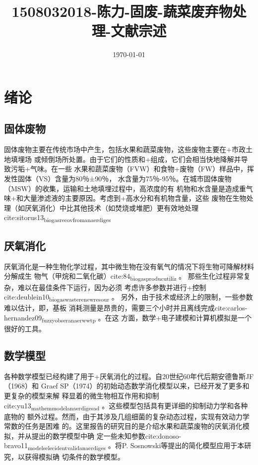 \documentclass[11pt]{article}
\date{\today}
\title{1508032018-陈力-固废-蔬菜废弃物处理-文献宗述}
\begin{document}
\maketitle
\tableofcontents



\section{绪论}
\label{sec:org1f9e960}
\subsection{固体废物}
\label{sec:org491d7c1}
固体废物主要在传统市场中产生，包括水果和蔬菜废物，这些废物主要在+市政土地填埋场
或倾倒场所处置。由于它们的性质和+组成，它们会相当快地降解并导致污垢+气味。在一些
水果和蔬菜废物（FVW）和食物+废物（FW）样品中，挥发性固体（VS）含量为80％±90％，
水含量为75％-95％。在城市固体废物（MSW）的收集，运输和土地填埋过程中，高浓度的有
机物和水含量是造成重气味+和大量渗滤液的主要原因。考虑到+高水分和有机物含量，这些
废物在生物处理（如厌氧消化）中比其他技术（如焚烧或堆肥）更有效地处理cite:sitorus13\textsubscript{biogas}\textsubscript{recov}\textsubscript{from}\textsubscript{anaer}\textsubscript{diges}

\subsection{厌氧消化}
\label{sec:org573a621}
厌氧消化是一种生物化学过程，其中微生物在没有氧气的情况下将生物可降解材料分解成生
物气（甲烷和二氧化碳）cite:84\textsubscript{biogas}\textsubscript{produc}\textsubscript{utiliz} 。 那些生化过程非常复杂，难以在最佳条件下运行，因为必须
考虑许多参数并进行+控制cite:deublein10\textsubscript{biogas}\textsubscript{waste}\textsubscript{renew}\textsubscript{resour} 。 另外，由于技术或经济上的限制，一些参数难以估计，即，基板
消耗测量是昂贵的，需要三个小时并且离线完成cite:carlos-hernandez09\textsubscript{fuzzy}\textsubscript{obser}\textsubscript{anaer}\textsubscript{wwtp} 。在这
方面，数学+电子建模和计算机模拟是一个很好的工具。

\subsection{数学模型}
\label{sec:org2bd16c4}
各种数学模型已经构建了用于+厌氧消化的过程。自20世纪60年代后期安德鲁斯JF（1968）和
Graef SP（1974）的初始动态数学消化模型以来，已经开发了更多和更复杂的模型来解
释显着的微生物相互作用和抑制cite:yu13\textsubscript{mathem}\textsubscript{model}\textsubscript{anaer}\textsubscript{diges}\textsubscript{ad} 。这些模型包括具有更详细的抑制动力学和各种底物的
额外过程。然而，由于其涉及几组细菌的复杂动态过程，实现有效动力学常数的任务是困难
的。这里报告的研究目的是介绍水果和蔬菜废物的厌氧消化模拟，并从提出的数学模型中确
定一些未知参数cite:donoso-bravo11\textsubscript{model}\textsubscript{selec}\textsubscript{ident}\textsubscript{valid}\textsubscript{anaer}\textsubscript{diges} 。将P. Sosnowski等提出的简化模型应用于本研究，以获得模拟确
切条件的数学模型。
\end{document}
